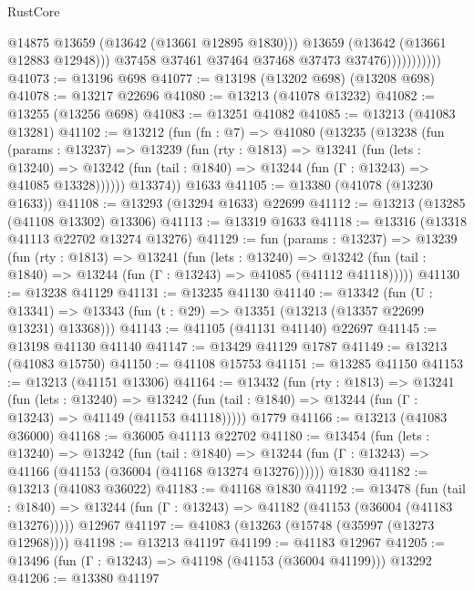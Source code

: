 \begin{lexlean}{RustCore}
\begin{coremodule}
                              @14875
                              @13659
                              (@13642 (@13661 @12895 @1830)))
                            @13659
                            (@13642 (@13661 @12883 @12948)))
                          @37458
                          @37461
                          @37464
                          @37468
                          @37473
                          @37476)))))))))))
@41073 := @13196 @698
@41077 := @13198 (@13202 @698) (@13208 @698)
@41078 := @13217 @22696
@41080 := @13213 (@41078 @13232)
@41082 := @13255 (@13256 @698)
@41083 := @13251 @41082
@41085 := @13213 (@41083 @13281)
@41102 := @13212
    (fun (fn : @7) =>
    @41080
      (@13235
        (@13238
          (fun (params : @13237) =>
          @13239
            (fun (rty : @1813) =>
            @13241
              (fun (lets : @13240) =>
              @13242 (fun (tail : @1840) => @13244 (fun (Γ : @13243) => @41085 @13328))))))
        @13374))
    @1633
@41105 := @13380 (@41078 (@13230 @1633))
@41108 := @13293 (@13294 @1633) @22699
@41112 := @13213 (@13285 (@41108 @13302) @13306)
@41113 := @13319 @1633
@41118 := @13316 (@13318 @41113 @22702 @13274 @13276)
@41129 := fun (params : @13237) =>
  @13239
    (fun (rty : @1813) =>
    @13241
      (fun (lets : @13240) =>
      @13242 (fun (tail : @1840) => @13244 (fun (Γ : @13243) => @41085 (@41112 @41118)))))
@41130 := @13238 @41129
@41131 := @13235 @41130
@41140 := @13342
    (fun (U : @13341) => @13343 (fun (t : @29) => @13351 (@13213 (@13357 @22699 @13231) @13368)))
@41143 := @41105 (@41131 @41140) @22697
@41145 := @13198 @41130 @41140
@41147 := @13429 @41129 @1787
@41149 := @13213 (@41083 @15750)
@41150 := @41108 @15753
@41151 := @13285 @41150
@41153 := @13213 (@41151 @13306)
@41164 := @13432
    (fun (rty : @1813) =>
    @13241
      (fun (lets : @13240) =>
      @13242 (fun (tail : @1840) => @13244 (fun (Γ : @13243) => @41149 (@41153 @41118)))))
    @1779
@41166 := @13213 (@41083 @36000)
@41168 := @36005 @41113 @22702
@41180 := @13454
    (fun (lets : @13240) =>
    @13242
      (fun (tail : @1840) =>
      @13244 (fun (Γ : @13243) => @41166 (@41153 (@36004 (@41168 @13274 @13276))))))
    @1830
@41182 := @13213 (@41083 @36022)
@41183 := @41168 @1830
@41192 := @13478
    (fun (tail : @1840) => @13244 (fun (Γ : @13243) => @41182 (@41153 (@36004 (@41183 @13276)))))
    @12967
@41197 := @41083 (@13263 (@15748 (@35997 (@13273 @12968))))
@41198 := @13213 @41197
@41199 := @41183 @12967
@41205 := @13496 (fun (Γ : @13243) => @41198 (@41153 (@36004 @41199))) @13292
@41206 := @13380 @41197

\end{coremodule}
\end{lexlean}
